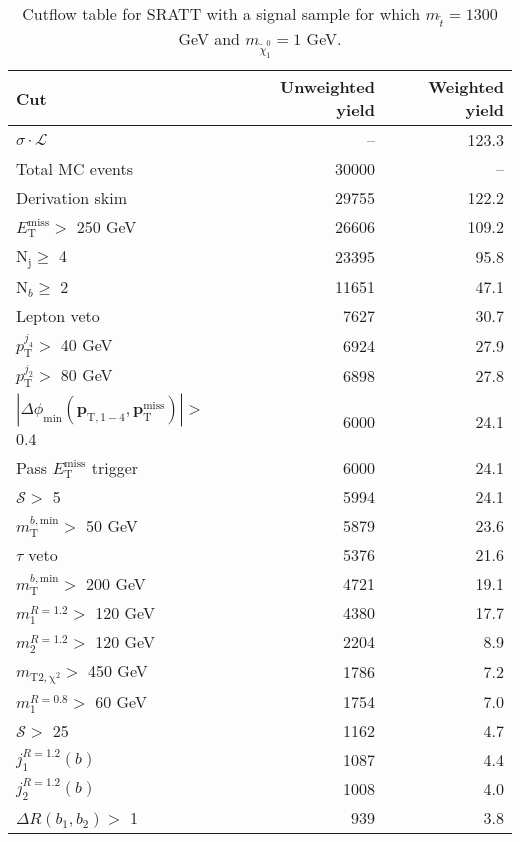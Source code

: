 
\begin{table}[htb]
  \caption{Cutflow table for SRATT with a signal sample for which $m_{\tilde{t}}=1300$ GeV and $m_{\tilde{\chi}^0_1}=1$ GeV.}
  \begin{center}
    \def\arraystretch{1.4}
    \begin{tabular}{l||r|r} \hline\hline
      \textbf{Cut} & Unweighted yield & Weighted yield \\ \hline \hline
      $\sigma\cdot\mathcal{L}$ & -- & 123.3 \\ \hline
      Total MC events & 30000 & -- \\ \hline
      Derivation skim & 29755 & 122.2 \\ \hline 
      $E_{\mathrm{T}}^{\mathrm{miss}} >$ 250 GeV & 26606 & 109.2 \\ \hline 
      $\mathrm{N}_{\mathrm{j}} \ge$ 4 & 23395 & 95.8 \\ \hline 
      $\mathrm{N}_{b} \ge$ 2 & 11651 & 47.1 \\ \hline 
      Lepton veto & 7627 & 30.7 \\ \hline 
      $p_{\mathrm{T}}^{j_4} >$ 40 GeV & 6924 & 27.9 \\ \hline 
      $p_{\mathrm{T}}^{j_2} >$ 80 GeV & 6898 & 27.8 \\ \hline 
      $\left|\Delta\phi_{\min}\left(\mathbf{p}_{\mathrm{T},1-4},\mathbf{p}_\mathrm{T}^\mathrm{miss}\right)\right| >$ 0.4 & 6000 & 24.1 \\ \hline 
Pass $E_{\mathrm{T}}^{\mathrm{miss}}$ trigger & 6000 & 24.1 \\ \hline 
$\mathcal{S} >$ 5 & 5994 & 24.1 \\ \hline 
$m_{\mathrm{T}}^{b,\mathrm{min}} >$ 50 GeV & 5879 & 23.6 \\ \hline 
$\tau$ veto & 5376 & 21.6 \\ \hline 
$m_{\mathrm{T}}^{b,\mathrm{min}} >$ 200 GeV & 4721 & 19.1 \\ \hline 
$m_{1}^{R=1.2} >$ 120 GeV & 4380 & 17.7 \\ \hline 
$m_{2}^{R=1.2} >$ 120 GeV & 2204 & 8.9 \\ \hline 
$m_{\mathrm{T2,\chi^2}} >$ 450 GeV & 1786 & 7.2 \\ \hline 
$m_{1}^{R=0.8} >$ 60 GeV & 1754 & 7.0 \\ \hline 
$\mathcal{S} >$ 25 & 1162 & 4.7 \\ \hline 
$j^{R=1.2}_1(b)$ & 1087 & 4.4 \\ \hline 
$j^{R=1.2}_2(b)$ & 1008 & 4.0 \\ \hline 
$\Delta R\left(b_1,b_2\right) >$ 1 & 939 & 3.8 \\ \hline 

\hline 
    \end{tabular}
  \end{center}
  \label{tab:cutFlow_SRATT}
\end{table}

